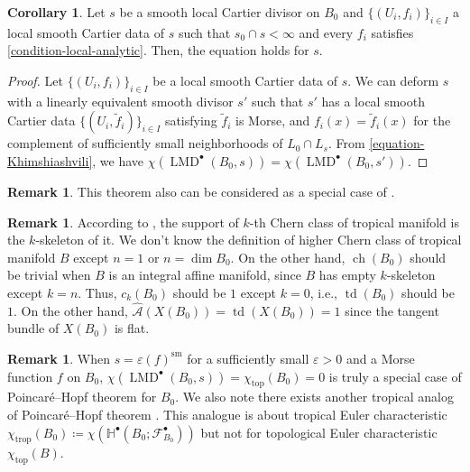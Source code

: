 \documentclass[a4paper,dvipdfmx,reqno,12pt]{amsart}
\theoremstyle{definition}
\newtheorem{corollary}[theorem]{Corollary}
\newtheorem{remark}[theorem]{Remark}
\newcommand{\deq}{\coloneqq}
\newcommand{\vep}{\varepsilon}%
\newcommand{\mb}[1]{\mathbb{#1}}%
\newcommand{\mcal}[1]{\mathcal{#1}}%
\newcommand{\opn}[1]{\operatorname{#1}}
\numberwithin{equation}{section}
\begin{document}
\begin{corollary}
Let $s$ be a smooth local Cartier divisor on $B_0$ and 
$\{(U_i,f_i)\}_{i\in I}$ a local smooth Cartier 
data of $s$ such that $s_0\cap s<\infty$ and
every $f_i$ satisfies \cref{condition-local-analytic}.
Then, the equation holds for $s$.
\end{corollary}

\begin{proof}
Let $\{(U_i,f_i)\}_{i\in I}$ be a local smooth Cartier
data of $s$. We can deform $s$ with a linearly equivalent
smooth divisor $s'$ 
such that $s'$ has a local smooth Cartier data 
$\{(U_i,\tilde{f}_i)\}_{i\in I}$ satisfying 
$\tilde{f}_i$ is Morse, and 
$f_i(x)=\tilde{f}_i(x)$ for the complement of 
sufficiently small neighborhoods of $L_0\cap L_s$. 
From \cref{equation-Khimshiashvili}, we have
$\chi(\opn{LMD}^{\bullet}(B_0,s))
=\chi(\opn{LMD}^{\bullet}(B_0,s'))$.
\end{proof}

\begin{remark} \label{rmk: integral_mirror}
This theorem also can be considered as
a special case of \cite{MR4301560}.
\end{remark}

\begin{remark}

According to \cite[5.3]{mikhalkinTropicalGeometryIts2006},
the support of $k$-th Chern class of tropical manifold is 
the $k$-skeleton of it.
We don't know the definition of higher Chern class of tropical manifold $B$ except
$n=1$ or $n=\dim B_0$. 
On the other hand, $\opn{ch}(B_0)$ should be trivial when $B$ is
an integral affine manifold, since $B$ has empty
$k$-skeleton except $k=n$.
Thus, $c_{k}(B_0)$ should be $1$ except $k=0$, 
i.e., $\opn{td}(B_0)$ should be $1$. 
On the other hand, $\hat{\mcal{A}}(X(B_0))=\opn{td}(X(B_0))=1$
since the tangent bundle of $X(B_0)$ is flat.
\end{remark}

\begin{remark}
When $s=\vep (f)^{\opn{sm}}$ for a sufficiently small $\vep >0$ and 
a Morse function $f$ on $B_0$, 
$\chi(\opn{LMD}^{\bullet}(B_0,s))=
\chi_{\opn{top}}(B_0)=0$ is 
truly a special case of Poincar\'e--Hopf theorem for $B_0$.
We also note there exists another tropical analog of Poincar\'e--Hopf theorem
  \cite{rau2020tropical}. This analogue is about tropical Euler characteristic
$\chi_{\opn{trop}}(B_0)\deq 
\chi(\mb{H}^{\bullet}(B_0;\mcal{F}_{B_0}^{\bullet}))$
  but not for topological Euler characteristic $\chi_{\opn{top}}(B)$.
\end{remark}
\end{document}
